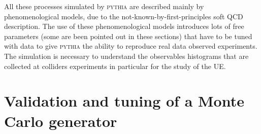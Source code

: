%


\noindent All these processes simulated by \textsc{pythia} are described mainly by phenomenological models, due to the not-known-by-first-principles soft QCD description. The use of these phenomenological models introduces lots of free parameters (some are been pointed out in these sections) that have to be tuned with data to give  \textsc{pythia} the ability to reproduce real data observed experiments. The simulation is necessary to understand the observables histograms that are collected at colliders experiments in particular for the study of the UE.  

\section{Validation and tuning of a Monte Carlo generator}

